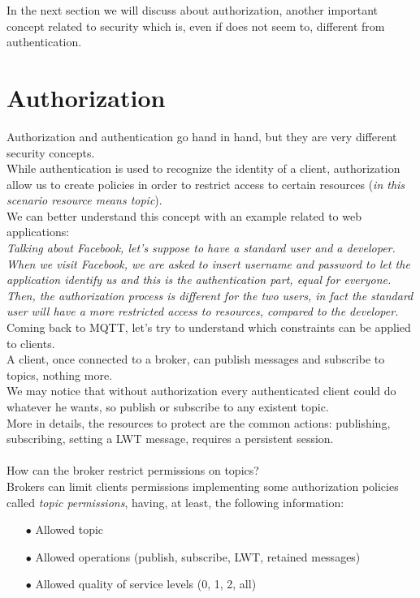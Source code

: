 \documentclass[12pt]{report}
\begin{document}
{In the next section we will discuss about authorization, another important concept related to security which is, even if does not seem to, different from authentication.\\


\section{Authorization}
\bigskip
Authorization and authentication go hand in hand, but they are very different security concepts.\\
While authentication is used to recognize the identity of a client, authorization allow us to create policies in order to restrict access to certain resources (\emph{in this scenario resource means topic}).\\
We can better understand this concept with an example related to web applications:\\

\emph{Talking about Facebook, let's suppose to have a standard user and a developer.
When we visit Facebook, we are asked to insert username and password to let the application identify us and this is the authentication part, equal for everyone.
Then, the authorization process is different for the two users, in fact the standard user will have a more restricted access to resources, compared to the developer.}\\

Coming back to MQTT, let's try to understand which constraints can be applied to clients.\\
A client, once connected to a broker, can publish messages and subscribe to topics, nothing more.\\
We may notice that without authorization every authenticated client could do whatever he wants, so publish or subscribe to any existent topic.\\
More in details, the resources to protect are the common actions: publishing, subscribing, setting a LWT message, requires a persistent session.\\\\
How can the broker restrict permissions on topics?\\

Brokers can limit clients permissions implementing some authorization policies called \emph{topic permissions}, having, at least, the following information:

\begin{itemize}
\setlength{\itemindent}{+4mm}
  \item[$\bullet$] Allowed topic
  \item[$\bullet$] Allowed operations (publish, subscribe, LWT, retained messages)
  \item[$\bullet$] Allowed quality of service levels (0, 1, 2, all)
\end{itemize}

}
\end{document}
